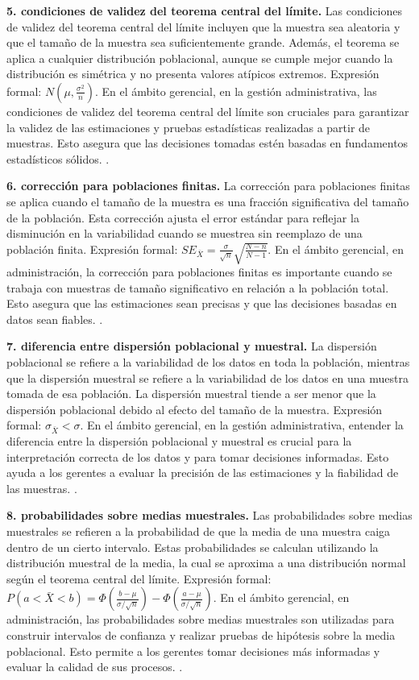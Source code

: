 {\textbf{5. condiciones de validez del teorema central del límite.} Las condiciones de validez del teorema central del límite incluyen que la muestra sea aleatoria y que el tamaño de la muestra sea suficientemente grande. Además, el teorema se aplica a cualquier distribución poblacional, aunque se cumple mejor cuando la distribución es simétrica y no presenta valores atípicos extremos. Expresión formal: $N(\mu, \frac{\sigma^2}{n})$. En el ámbito gerencial, en la gestión administrativa, las condiciones de validez del teorema central del límite son cruciales para garantizar la validez de las estimaciones y pruebas estadísticas realizadas a partir de muestras. Esto asegura que las decisiones tomadas estén basadas en fundamentos estadísticos sólidos. \citep{anderson2012,lind2012,wackerly2010}.

\textbf{6. corrección para poblaciones finitas.} La corrección para poblaciones finitas se aplica cuando el tamaño de la muestra es una fracción significativa del tamaño de la población. Esta corrección ajusta el error estándar para reflejar la disminución en la variabilidad cuando se muestrea sin reemplazo de una población finita. Expresión formal: $SE_{\bar{X}} = \frac{\sigma}{\sqrt{n}} \sqrt{\frac{N-n}{N-1}}$. En el ámbito gerencial, en administración, la corrección para poblaciones finitas es importante cuando se trabaja con muestras de tamaño significativo en relación a la población total. Esto asegura que las estimaciones sean precisas y que las decisiones basadas en datos sean fiables. \citep{anderson2012,lind2012,wackerly2010}.

\textbf{7. diferencia entre dispersión poblacional y muestral.} La dispersión poblacional se refiere a la variabilidad de los datos en toda la población, mientras que la dispersión muestral se refiere a la variabilidad de los datos en una muestra tomada de esa población. La dispersión muestral tiende a ser menor que la dispersión poblacional debido al efecto del tamaño de la muestra. Expresión formal: $\sigma_{\bar{X}} < \sigma$. En el ámbito gerencial, en la gestión administrativa, entender la diferencia entre la dispersión poblacional y muestral es crucial para la interpretación correcta de los datos y para tomar decisiones informadas. Esto ayuda a los gerentes a evaluar la precisión de las estimaciones y la fiabilidad de las muestras. \citep{anderson2012,lind2012,wackerly2010}.

\textbf{8. probabilidades sobre medias muestrales.} Las probabilidades sobre medias muestrales se refieren a la probabilidad de que la media de una muestra caiga dentro de un cierto intervalo. Estas probabilidades se calculan utilizando la distribución muestral de la media, la cual se aproxima a una distribución normal según el teorema central del límite. Expresión formal: $P(a < \bar{X} < b) = \Phi\left(\frac{b - \mu}{\sigma / \sqrt{n}}\right) - \Phi\left(\frac{a - \mu}{\sigma / \sqrt{n}}\right)$. En el ámbito gerencial, en administración, las probabilidades sobre medias muestrales son utilizadas para construir intervalos de confianza y realizar pruebas de hipótesis sobre la media poblacional. Esto permite a los gerentes tomar decisiones más informadas y evaluar la calidad de sus procesos. \citep{anderson2012,lind2012,wackerly2010}.


}
